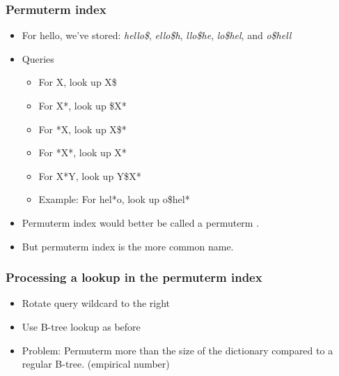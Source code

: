 \documentclass[compress]{beamer}
\def\term#1{{\sc #1}}   %
\begin{document}
\begin{frame}
\frametitle{Permuterm index}
\begin{itemize}[<+->]
\item For \term{hello}, we've stored:
\emph{hello\$},
\emph{ello\$h},
\emph{llo\$he},
\emph{lo\$hel}, and
\emph{o\$hell}
\item Queries
\begin{itemize}[<+->]
\item For X, look up X\$
\item For X*, look up \$X*
\item For *X, look up X\$*
\item For *X*, look up X*
\item For X*Y, look up Y\$X*
\item Example: For hel*o, look up o\$hel*
\end{itemize}
\item Permuterm index would better be called a permuterm .
\item But permuterm index is the more common name.
\end{itemize}
\end{frame}

\begin{frame}
\frametitle{Processing a lookup in the permuterm index}
\begin{itemize}[<+->]
\item Rotate query wildcard to the right
\item Use B-tree lookup as before
\item Problem: Permuterm more than  the size of the
  dictionary compared to a regular B-tree. (empirical number)
\end{itemize}
\end{frame}
\end{document}
